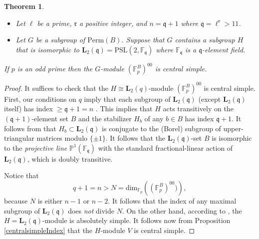 \documentclass[12pt,a4paper,reqno]{amsart}
\def\F{{\mathbb F}}
\def\dim{\mathrm{dim}}
\newtheorem{thm}{Theorem}[section]
\theoremstyle{definition}
\begin{document}
\begin{thm}
 \label{PSL2Central}
 \begin{itemize}
 \item[(i)]
 Let $\ell$ be a prime, $\mathfrak{r}$ a positive integer, and 
  $n=\mathfrak{q}+1$ where $\mathfrak{q}=\ell^{\mathfrak{r}}>11$.
\item[(ii)]
 Let $G$ be a subgroup of $\mathrm{Perm}(B)$.
 Suppose that $G$ contains a subgroup $H$ that
 is isomorphic to $\mathbf{L}_2(\mathfrak{q})=\mathrm{PSL}(2,\F_{\mathfrak{q}})$ where $\F_{\mathfrak{q}}$ is a $\mathfrak{q}$-element field.
 \end{itemize}
 
  If $p$ is an odd prime
 then the $G$-module  $(\F_p^{B})^{00}$ is central simple.
 \end{thm}
 
 \begin{proof}
 It suffices to check that the $H\cong \mathbf{L}_2(q)$-module  $(\F_p^{B})^{00}$ is central simple.
First, our conditions on $q$ imply that each subgroup of $\mathbf{L}_2(\mathfrak{q})$ (except $\mathbf{L}_2(\mathfrak{q})$ itself) has index $\ge \mathfrak{q}+1=n$
\cite[p. 414, (6.27)]{Suzuki}. This implies that $H$ acts transitively on the $(\mathfrak{q}+1)$-element
set $B$ and the stabilizer $H_b$ of any $b \in B$ has index $\mathfrak{q}+1$. It follows  from \cite[Th. 6.25 on p. 412]{Suzuki}
that $H_b\subset \mathbf{L}_2(\mathfrak{q})$ is  conjugate to the (Borel) subgroup of upper-triangular matrices modulo $\{\pm 1\}$.
It follows that the $ \mathbf{L}_2(\mathfrak{q})$-set $B$ is isomorphic to the {\sl projective line} $\mathbb{P}^1(\F_{\mathfrak{q}})$ with the standard
fractional-linear action of $ \mathbf{L}_2(\mathfrak{q})$, which is doubly transitive.

Notice that 
$$q+1=n>N=\dim_{\F_p}\left((\F_p^{B})^{00})\right),$$
because $N$ is either $n-1$ or $n-2$. It follows that the index of any maximal subgroup of $\mathbf{L}_2(\mathfrak{q})$ does {\sl not} divide $N$.
On the other hand, according to \cite[Table 1]{Mortimer}, the $H=\mathbf{L}_2(\mathfrak{q})$-module is absolutely simple. It follows now from Proposition
\ref{centralsimpleIndex} that the $H$-module $V$ is central simple.
 \end{proof}
\end{document}
